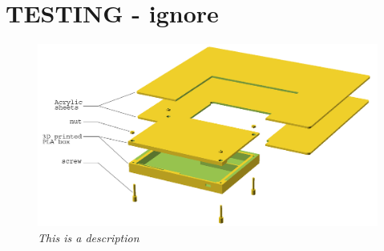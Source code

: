 \section{TESTING - ignore}

\begin{figure}[h]
\begin{center}
\includegraphics[scale=0.5]{figures/explode.png}
\caption{\small {\it {This is a description}}} \label{fig:explode}
\end{center}
\end{figure}